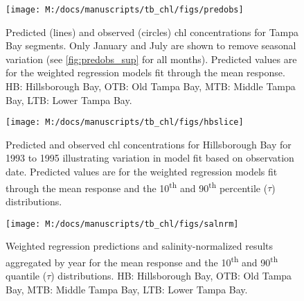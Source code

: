 \documentclass[letterpaper,12pt,oneside]{article}\usepackage[]{graphicx}\usepackage[]{color}
\begin{document}
\begin{landscape}
\centering\vspace*{\fill}
\begin{figure}[!ht]


{\centering \texttt{[image: M:/docs/manuscripts/tb\_chl/figs/predobs]} 

}

\caption[Predicted (lines) and observed (circles) \ac{chl} concentrations for Tampa Bay segments]{Predicted (lines) and observed (circles) \ac{chl} concentrations for Tampa Bay segments. Only January and July are shown to remove seasonal variation (see \cref{fig:predobs_sup} for all months).  Predicted values are for the weighted regression models fit through the mean response. HB: Hillsborough Bay, OTB: Old Tampa Bay, MTB: Middle Tampa Bay, LTB: Lower Tampa Bay.\label{fig:predobs}}
\end{figure}


\vfill
\end{landscape}

\centering\vspace*{\fill}
\begin{figure}[!ht]


{\centering \texttt{[image: M:/docs/manuscripts/tb\_chl/figs/hbslice]} 

}

\caption[Predicted and observed \ac{chl} concentrations for Hillsborough Bay for 1993 to 1995 illustrating variation in model fit based on observation date]{Predicted and observed \ac{chl} concentrations for Hillsborough Bay for 1993 to 1995 illustrating variation in model fit based on observation date. Predicted values are for the weighted regression models fit through the mean response and the 10\textsuperscript{th} and 90\textsuperscript{th} percentile ($\tau$) distributions.\label{fig:hbslice}}
\end{figure}


\vfill

\begin{landscape}
\centering\vspace*{\fill}
\begin{figure}[!ht]


{\centering \texttt{[image: M:/docs/manuscripts/tb\_chl/figs/salnrm]} 

}

\caption[Weighted regression predictions and salinity-normalized results aggregated by year for the mean response and the 10\textsuperscript{th} and 90\textsuperscript{th} quantile ($\tau$) distributions]{Weighted regression predictions and salinity-normalized results aggregated by year for the mean response and the 10\textsuperscript{th} and 90\textsuperscript{th} quantile ($\tau$) distributions. HB: Hillsborough Bay, OTB: Old Tampa Bay, MTB: Middle Tampa Bay, LTB: Lower Tampa Bay.\label{fig:salnrm}}
\end{figure}


\vfill
\end{landscape}
\end{document}
